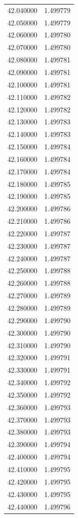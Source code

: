 \begin{tabular}{rr}
42.040000 & 1.499779 \\
42.050000 & 1.499779 \\
42.060000 & 1.499780 \\
42.070000 & 1.499780 \\
42.080000 & 1.499781 \\
42.090000 & 1.499781 \\
42.100000 & 1.499781 \\
42.110000 & 1.499782 \\
42.120000 & 1.499782 \\
42.130000 & 1.499783 \\
42.140000 & 1.499783 \\
42.150000 & 1.499784 \\
42.160000 & 1.499784 \\
42.170000 & 1.499784 \\
42.180000 & 1.499785 \\
42.190000 & 1.499785 \\
42.200000 & 1.499786 \\
42.210000 & 1.499786 \\
42.220000 & 1.499787 \\
42.230000 & 1.499787 \\
42.240000 & 1.499787 \\
42.250000 & 1.499788 \\
42.260000 & 1.499788 \\
42.270000 & 1.499789 \\
42.280000 & 1.499789 \\
42.290000 & 1.499790 \\
42.300000 & 1.499790 \\
42.310000 & 1.499790 \\
42.320000 & 1.499791 \\
42.330000 & 1.499791 \\
42.340000 & 1.499792 \\
42.350000 & 1.499792 \\
42.360000 & 1.499793 \\
42.370000 & 1.499793 \\
42.380000 & 1.499793 \\
42.390000 & 1.499794 \\
42.400000 & 1.499794 \\
42.410000 & 1.499795 \\
42.420000 & 1.499795 \\
42.430000 & 1.499795 \\
42.440000 & 1.499796 \\

\end{tabular}
